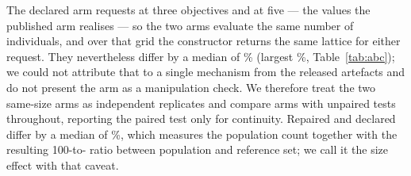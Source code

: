 \documentclass{SCIS2026}
\begin{document}
The declared arm requests \abcDeclReqMthree{} at three objectives and \abcDeclReqMfive{} at five --- the values the published arm realises --- so the two arms evaluate the same number of individuals, and over that grid the constructor returns the same lattice for either request. They nevertheless differ by a median of \abcDeclVsPubAbsMed\% (largest \abcDeclVsPubMax\%, Table~\ref{tab:abc}); we could not attribute that to a single mechanism from the released artefacts and do not present the arm as a manipulation check. We therefore treat the two same-size arms as independent replicates and compare arms with unpaired tests throughout, reporting the paired test only for continuity. Repaired and declared differ by a median of \abcRepVsDeclMed\%, which measures the population count together with the resulting 100-to-\retMthree{} ratio between population and reference set; we call it the size effect with that caveat.

\begin{table}[!t]
\centering
\footnotesize
\caption{Three-arm comparison: published, declared and repaired, on the same host and seeds. Published declares 100 and realises \retMthree{}; declared declares and realises \retMthree{} (the request is \abcDeclReqMthree{} at three objectives and \abcDeclReqMfive{} at five); repaired declares and realises 100. The three right-hand columns are median relative changes of the first-named arm against the second, positive meaning the first attains a smaller indicator, so that \emph{decl\,$-$\,pub} measures the difference between two arms that realise the same population but are not bit-identical (Section~\ref{sec:abc}) --- an unexplained residual rather than a clean manipulation check --- \emph{rep\,$-$\,decl} the size effect with the reference-set cardinality held at $L$, and \emph{rep\,$-$\,pub} the combined (size plus residual) effect}
\label{tab:abc}

\end{table}
\end{document}
